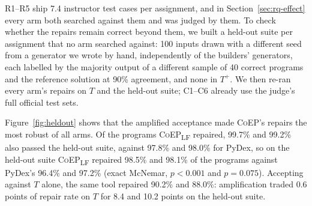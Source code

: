 \documentclass[acmsmall,screen,review,anonymous,nonacm]{acmart}
\newcommand{\tool}{\textsc{CoEP}\xspace}
\newcommand{\coepLF}{\textsc{CoEP}\textsubscript{LF}\xspace}
\begin{document}
R1--R5 ship 7.4 instructor test cases per assignment, and in Section~\ref{sec:rq-effect} every arm both searched against them and was judged by them. To check whether the repairs remain correct beyond them, we built a held-out suite per assignment that no arm searched against: 100 inputs drawn with a different seed from a generator we wrote by hand, independently of the builders' generators, each labelled by the majority output of a different sample of 40 correct programs and the reference solution at 90\% agreement, and none in $T^{+}$. We then re-ran every arm's repairs on $T$ and the held-out suite; C1--C6 already use the judge's full official test sets.

Figure~\ref{fig:heldout} shows that the amplified acceptance made \tool's repairs the most robust of all arms. Of the programs \coepLF repaired, 99.7\% and 99.2\% also passed the held-out suite, against 97.8\% and 98.0\% for PyDex, so on the held-out suite \coepLF repaired 98.5\% and 98.1\% of the programs against PyDex's 96.4\% and 97.2\% (exact McNemar, $p < 0.001$ and $p = 0.075$). Accepting against $T$ alone, the same tool repaired 90.2\% and 88.0\%: amplification traded 0.6 points of repair rate on $T$ for 8.4 and 10.2 points on the held-out suite.
\end{document}
